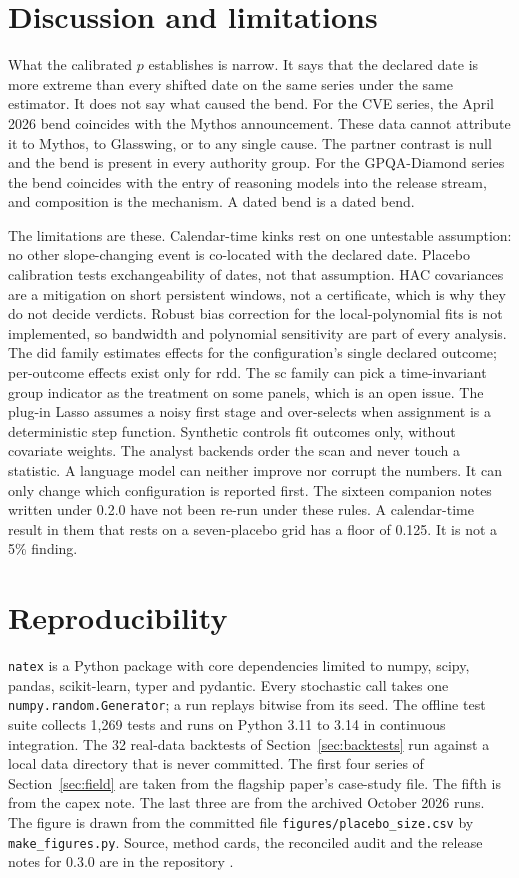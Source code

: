 \documentclass[11pt]{article}
\newcommand{\natex}{\texttt{natex}}
\newcommand{\code}[1]{\texttt{#1}}
\begin{document}
\section{Discussion and limitations}\label{sec:limits}

What the calibrated $p$ establishes is narrow. It says that the declared date is more
extreme than every shifted date on the same series under the same estimator. It does not
say what caused the bend. For the CVE series, the April 2026 bend coincides with the Mythos announcement. These data
cannot attribute it to Mythos, to Glasswing, or to any single cause. The partner contrast
is null and the bend is present in every authority group. For the GPQA-Diamond series the bend coincides with the entry of
reasoning models into the release stream, and composition is the mechanism. A dated bend
is a dated bend.

The limitations are these. Calendar-time kinks rest on one untestable assumption: no other slope-changing event is
co-located with the declared date. Placebo calibration tests exchangeability of dates, not
that assumption. HAC covariances are a mitigation on
short persistent windows, not a certificate, which is why they do not decide verdicts.
Robust bias correction for the local-polynomial fits is not implemented, so bandwidth
and polynomial sensitivity are part of every analysis. The did family estimates effects
for the configuration's single declared outcome; per-outcome effects exist only for rdd.
The sc family can pick a time-invariant group indicator as the treatment on some panels,
which is an open issue. The plug-in Lasso assumes a noisy first stage and over-selects
when assignment is a deterministic step function. Synthetic controls fit outcomes only,
without covariate weights. The analyst backends order the scan and never touch a statistic. A language model can
neither improve nor corrupt the numbers. It can only change which configuration is
reported first. The sixteen companion notes written under 0.2.0 have not been re-run under these rules. A
calendar-time result in them that rests on a seven-placebo grid has a floor of 0.125. It
is not a 5\% finding.

\section{Reproducibility}\label{sec:repro}

\natex{} is a Python package with core dependencies limited to numpy, scipy, pandas,
scikit-learn, typer and pydantic. Every stochastic call takes one
\code{numpy.random.Generator}; a run replays bitwise from its seed. The offline test suite collects 1{,}269 tests and runs on Python 3.11 to 3.14 in
continuous integration. The 32 real-data backtests of Section~\ref{sec:backtests} run
against a local data directory that is never committed. The first four series of
Section~\ref{sec:field} are taken from the flagship paper's case-study file. The fifth is
from the capex note. The last three are from the archived October 2026 runs. The figure is drawn from the
committed file \code{figures/placebo\_size.csv} by \code{make\_figures.py}. Source,
method cards, the reconciled audit and the release notes for 0.3.0 are in the
repository \cite{natex}.
\end{document}
